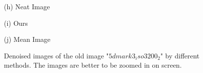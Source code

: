 \documentclass[10pt,twocolumn,letterpaper]{article}
\begin{document}
\begin{figure}
{\begin{minipage}[t]{0.2\textwidth}
{\footnotesize (h) Neat Image}
\end{minipage}
\begin{minipage}[t]{0.2\textwidth}
\centering
{}
{\footnotesize (i) Ours }
\end{minipage}
\begin{minipage}[t]{0.2\textwidth}
\centering
{}
{\footnotesize (j) Mean Image }
\end{minipage}
}
\caption{Denoised images of the old image "$5dmark3_iso3200_2$" by different methods. The images are better to be zoomed in on screen.}
\label{fig2}
\end{figure}
\end{document}
